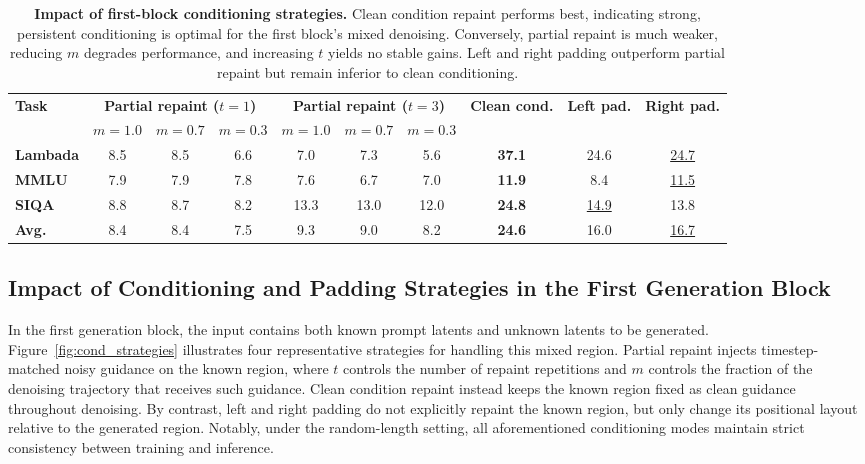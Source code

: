 \begin{table}[t]
    \centering
    \caption{\textbf{Impact of first-block conditioning strategies.} Clean condition repaint performs best, indicating strong, persistent conditioning is optimal for the first block's mixed denoising. Conversely, partial repaint is much weaker, reducing $m$ degrades performance, and increasing $t$ yields no stable gains. Left and right padding outperform partial repaint but remain inferior to clean conditioning.}
    \label{tab:first_block_conditioning}
    \small
    \setlength{\tabcolsep}{3.8pt}
    \renewcommand{\arraystretch}{1.10}
    \begin{tabular*}{\linewidth}{@{\extracolsep{\fill}}lccccccccc}
        \toprule
        \multirow{2}{*}{\textbf{Task}}
        & \multicolumn{3}{c}{\textbf{Partial repaint ($t=1$)}}
        & \multicolumn{3}{c}{\textbf{Partial repaint ($t=3$)}}
        & \multirow{2}{*}{\textbf{Clean cond.}}
        & \multirow{2}{*}{\textbf{Left pad.}}
        & \multirow{2}{*}{\textbf{Right pad.}} \\
        \cmidrule(lr){2-4} \cmidrule(lr){5-7}
        & \textbf{$m=1.0$} & \textbf{$m=0.7$} & \textbf{$m=0.3$}
        & \textbf{$m=1.0$} & \textbf{$m=0.7$} & \textbf{$m=0.3$}
        & \multicolumn{3}{c}{} \\
        \midrule
        \textbf{Lambada} & 8.5 & 8.5 & 6.6 & 7.0 & 7.3 & 5.6 & \textbf{37.1} & 24.6 & \underline{24.7} \\
        \textbf{MMLU}    & 7.9 & 7.9 & 7.8 & 7.6 & 6.7 & 7.0 & \textbf{11.9} & 8.4  & \underline{11.5} \\
        \textbf{SIQA}    & 8.8 & 8.7 & 8.2 & 13.3 & 13.0 & 12.0 & \textbf{24.8} & \underline{14.9} & 13.8 \\
        \midrule
        \textbf{Avg.}    & 8.4 & 8.4 & 7.5 & 9.3 & 9.0 & 8.2 & \textbf{24.6} & 16.0 & \underline{16.7} \\
        \bottomrule
    \end{tabular*}
\end{table}

\subsection{Impact of Conditioning and Padding Strategies in the First Generation Block}
\label{sec:first_block_conditioning}

In the first generation block, the input contains both known prompt latents and unknown latents to be generated. Figure~\ref{fig:cond_strategies} illustrates four representative strategies for handling this mixed region. Partial repaint injects timestep-matched noisy guidance on the known region, where $t$ controls the number of repaint repetitions and $m$ controls the fraction of the denoising trajectory that receives such guidance. Clean condition repaint instead keeps the known region fixed as clean guidance throughout denoising. By contrast, left and right padding do not explicitly repaint the known region, but only change its positional layout relative to the generated region. Notably, under the random-length setting, all aforementioned conditioning modes maintain strict consistency between training and inference.

